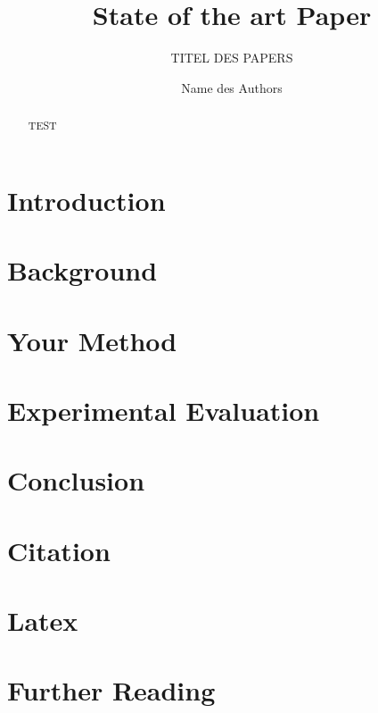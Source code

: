 \documentclass[a4paper, 11pt, sigconf]{acmart}
\begin{document}
\title{State of the art Paper}
\subtitle{TITEL DES PAPERS}

\author{Name des Authors}






\begin{abstract}
TEST
\end{abstract}

\maketitle
\tableofcontents


\section{Introduction}


\section{Background}


\section{Your Method}

\section{Experimental Evaluation}

\section{Conclusion}

\section{Citation}


\section{Latex}


\section{Further Reading}
\end{document}

